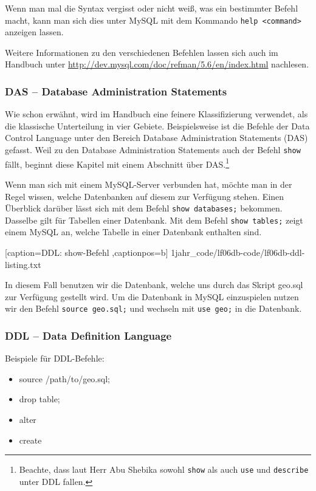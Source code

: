 Wenn man mal die Syntax vergisst oder nicht weiß, was ein bestimmter Befehl macht, kann man sich dies unter MySQL mit dem Kommando \texttt{help <command>} anzeigen lassen.

Weitere Informationen zu den verschiedenen Befehlen lassen sich auch im Handbuch unter \url{http://dev.mysql.com/doc/refman/5.6/en/index.html} nachlesen.

\subsubsection{DAS -- Database Administration Statements}

Wie schon erwähnt, wird im Handbuch eine feinere Klassifizierung verwendet, als die klassische Unterteilung in vier Gebiete. Beispielsweise ist die Befehle der Data Control Language unter den Bereich Database Administration Statements (DAS) gefasst. Weil zu den Database Administration Statements auch der Befehl \texttt{show} fällt, beginnt diese Kapitel mit einem Abschnitt über DAS.\footnote{Beachte, dass laut Herr Abu Shebika sowohl \texttt{show} als auch \texttt{use} und \texttt{describe} unter DDL fallen.}

Wenn man sich mit einem MySQL-Server verbunden hat, möchte man in der Regel wissen, welche Datenbanken auf diesem zur Verfügung stehen. Einen Überblick darüber lässt sich mit dem Befehl \texttt{show databases;} bekommen. Dasselbe gilt für Tabellen einer Datenbank. Mit dem Befehl \texttt{show tables;} zeigt einem MySQL an, welche Tabelle in einer Datenbank enthalten sind.


	[caption={DDL: show-Befehl}
	\label{lst:ddl-show},captionpos=b]
	{1jahr_code/lf06db-code/lf06db-ddl-listing.txt}

In diesem Fall benutzen wir die Datenbank, welche uns durch das Skript geo.sql zur Verfügung gestellt wird. Um die Datenbank in MySQL einzuspielen nutzen wir den Befehl \texttt{source geo.sql;} und wechseln mit \texttt{use geo;} in die Datenbank.

\subsubsection{DDL -- Data Definition Language}
Beispiele für DDL-Befehle:

	\begin{itemize}
		\item source /path/to/geo.sql;
		\item drop table;
		\item alter
		\item create
	\end{itemize}

